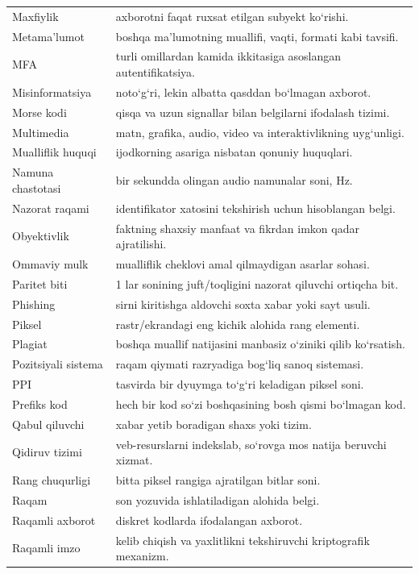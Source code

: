 \documentclass[11pt,a4paper,oneside]{book}
\begin{document}
\begin{longtable}{@{}L{38mm}L{127mm}@{}}
Maxfiylik & axborotni faqat ruxsat etilgan subyekt ko‘rishi.\\
Metama’lumot & boshqa ma’lumotning muallifi, vaqti, formati kabi tavsifi.\\
MFA & turli omillardan kamida ikkitasiga asoslangan autentifikatsiya.\\
Misinformatsiya & noto‘g‘ri, lekin albatta qasddan bo‘lmagan axborot.\\
Morse kodi & qisqa va uzun signallar bilan belgilarni ifodalash tizimi.\\
Multimedia & matn, grafika, audio, video va interaktivlikning uyg‘unligi.\\
Mualliflik huquqi & ijodkorning asariga nisbatan qonuniy huquqlari.\\
Namuna chastotasi & bir sekundda olingan audio namunalar soni, Hz.\\
Nazorat raqami & identifikator xatosini tekshirish uchun hisoblangan belgi.\\
Obyektivlik & faktning shaxsiy manfaat va fikrdan imkon qadar ajratilishi.\\
Ommaviy mulk & mualliflik cheklovi amal qilmaydigan asarlar sohasi.\\
Paritet biti & 1 lar sonining juft/toqligini nazorat qiluvchi ortiqcha bit.\\
Phishing & sirni kiritishga aldovchi soxta xabar yoki sayt usuli.\\
Piksel & rastr/ekrandagi eng kichik alohida rang elementi.\\
Plagiat & boshqa muallif natijasini manbasiz o‘ziniki qilib ko‘rsatish.\\
Pozitsiyali sistema & raqam qiymati razryadiga bog‘liq sanoq sistemasi.\\
PPI & tasvirda bir dyuymga to‘g‘ri keladigan piksel soni.\\
Prefiks kod & hech bir kod so‘zi boshqasining bosh qismi bo‘lmagan kod.\\
Qabul qiluvchi & xabar yetib boradigan shaxs yoki tizim.\\
Qidiruv tizimi & veb-resurslarni indekslab, so‘rovga mos natija beruvchi xizmat.\\
Rang chuqurligi & bitta piksel rangiga ajratilgan bitlar soni.\\
Raqam & son yozuvida ishlatiladigan alohida belgi.\\
Raqamli axborot & diskret kodlarda ifodalangan axborot.\\
Raqamli imzo & kelib chiqish va yaxlitlikni tekshiruvchi kriptografik mexanizm.\\

\end{longtable}
\end{document}
